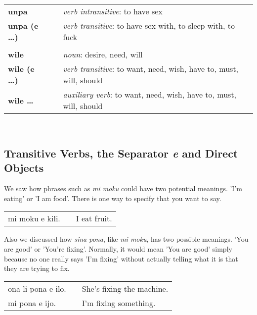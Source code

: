 \begin{supertabular}{p{2,5cm}|ll}
\textbf{unpa} && \textit{verb intransitive}: to have sex \\ %
\textbf{unpa (e \dots)} && \textit{verb transitive}: to have sex with, to sleep with, to fuck \\ %
 && \\ %
%
\textbf{wile} && \textit{noun}: desire, need, will \\ %
\textbf{wile (e \dots)} && \textit{verb transitive}: to want, need, wish, have to, must, will, should \\ %
\textbf{wile \dots} && \textit{auxiliary verb}: to want, need, wish, have to, must, will, should \\ %
\end{supertabular} \\
%
\newpage
\subsection*{Transitive Verbs, the Separator \textit{e} and Direct Objects}
%
%
We saw how phrases such as \textit{mi moku} could have two potential meanings. 
'I'm eating' or 'I am food'. 
There is one way to specify that you want to say. 

\begin{supertabular}{p{5,5cm}|ll}
mi moku e kili. && I eat fruit. \\
\end{supertabular} 

Also we discussed how \textit{sina pona}, like \textit{mi moku}, has two possible meanings. 
'You are good' or 'You're fixing'. 
Normally, it would mean 'You are good' simply because no one really says 'I'm fixing' without actually telling what it is that they are trying to fix. 

\begin{supertabular}{p{5,5cm}|ll}
ona li pona e ilo. && She's fixing the machine. \\
mi pona e ijo. && I'm fixing something. \\
\end{supertabular} 

